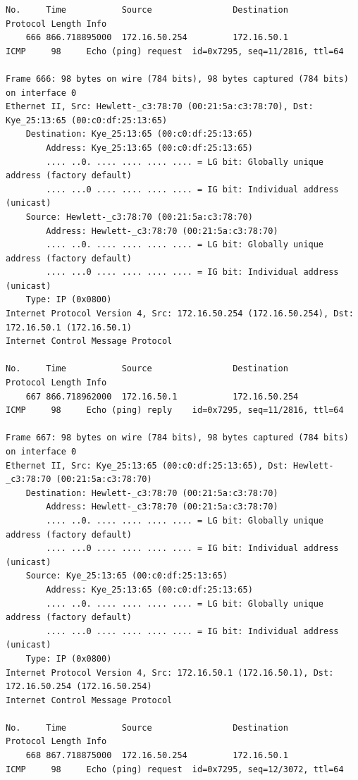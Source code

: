 \documentclass[a4paper,11pt]{article}
\begin{document}
\begin{lstlisting}
No.     Time           Source                Destination           Protocol Length Info
    666 866.718895000  172.16.50.254         172.16.50.1           ICMP     98     Echo (ping) request  id=0x7295, seq=11/2816, ttl=64

Frame 666: 98 bytes on wire (784 bits), 98 bytes captured (784 bits) on interface 0
Ethernet II, Src: Hewlett-_c3:78:70 (00:21:5a:c3:78:70), Dst: Kye_25:13:65 (00:c0:df:25:13:65)
    Destination: Kye_25:13:65 (00:c0:df:25:13:65)
        Address: Kye_25:13:65 (00:c0:df:25:13:65)
        .... ..0. .... .... .... .... = LG bit: Globally unique address (factory default)
        .... ...0 .... .... .... .... = IG bit: Individual address (unicast)
    Source: Hewlett-_c3:78:70 (00:21:5a:c3:78:70)
        Address: Hewlett-_c3:78:70 (00:21:5a:c3:78:70)
        .... ..0. .... .... .... .... = LG bit: Globally unique address (factory default)
        .... ...0 .... .... .... .... = IG bit: Individual address (unicast)
    Type: IP (0x0800)
Internet Protocol Version 4, Src: 172.16.50.254 (172.16.50.254), Dst: 172.16.50.1 (172.16.50.1)
Internet Control Message Protocol

No.     Time           Source                Destination           Protocol Length Info
    667 866.718962000  172.16.50.1           172.16.50.254         ICMP     98     Echo (ping) reply    id=0x7295, seq=11/2816, ttl=64

Frame 667: 98 bytes on wire (784 bits), 98 bytes captured (784 bits) on interface 0
Ethernet II, Src: Kye_25:13:65 (00:c0:df:25:13:65), Dst: Hewlett-_c3:78:70 (00:21:5a:c3:78:70)
    Destination: Hewlett-_c3:78:70 (00:21:5a:c3:78:70)
        Address: Hewlett-_c3:78:70 (00:21:5a:c3:78:70)
        .... ..0. .... .... .... .... = LG bit: Globally unique address (factory default)
        .... ...0 .... .... .... .... = IG bit: Individual address (unicast)
    Source: Kye_25:13:65 (00:c0:df:25:13:65)
        Address: Kye_25:13:65 (00:c0:df:25:13:65)
        .... ..0. .... .... .... .... = LG bit: Globally unique address (factory default)
        .... ...0 .... .... .... .... = IG bit: Individual address (unicast)
    Type: IP (0x0800)
Internet Protocol Version 4, Src: 172.16.50.1 (172.16.50.1), Dst: 172.16.50.254 (172.16.50.254)
Internet Control Message Protocol

No.     Time           Source                Destination           Protocol Length Info
    668 867.718875000  172.16.50.254         172.16.50.1           ICMP     98     Echo (ping) request  id=0x7295, seq=12/3072, ttl=64


\end{lstlisting}
\end{document}
